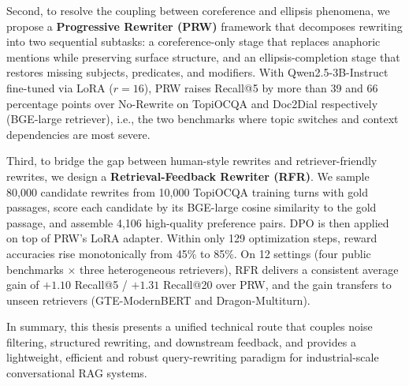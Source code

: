 Second, to resolve the coupling between coreference and ellipsis phenomena, we propose a \textbf{Progressive Rewriter (PRW)} framework that decomposes rewriting into two sequential subtasks: a coreference-only stage that replaces anaphoric mentions while preserving surface structure, and an ellipsis-completion stage that restores missing subjects, predicates, and modifiers. With Qwen2.5-3B-Instruct fine-tuned via LoRA ($r{=}16$), PRW raises Recall@5 by more than 39 and 66 percentage points over No-Rewrite on TopiOCQA and Doc2Dial respectively (BGE-large retriever), i.e., the two benchmarks where topic switches and context dependencies are most severe.

Third, to bridge the gap between human-style rewrites and retriever-friendly rewrites, we design a \textbf{Retrieval-Feedback Rewriter (RFR)}. We sample 80{,}000 candidate rewrites from 10{,}000 TopiOCQA training turns with gold passages, score each candidate by its BGE-large cosine similarity to the gold passage, and assemble 4{,}106 high-quality preference pairs. DPO is then applied on top of PRW's LoRA adapter. Within only 129 optimization steps, reward accuracies rise monotonically from 45\% to 85\%. On 12 settings (four public benchmarks $\times$ three heterogeneous retrievers), RFR delivers a consistent average gain of $+1.10$ Recall@5 / $+1.31$ Recall@20 over PRW, and the gain transfers to unseen retrievers (GTE-ModernBERT and Dragon-Multiturn).

In summary, this thesis presents a unified technical route that couples noise filtering, structured rewriting, and downstream feedback, and provides a lightweight, efficient and robust query-rewriting paradigm for industrial-scale conversational RAG systems.

